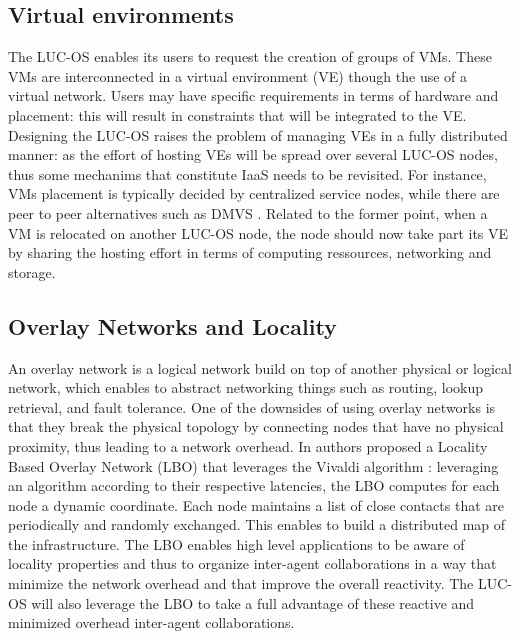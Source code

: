 \subsection{Virtual environments}

The LUC-OS enables its users to request the creation of groups of VMs. These
VMs are interconnected in a virtual environment (VE) though the use of a virtual
network. Users may have specific requirements in terms of hardware and 
placement: this will result in constraints that will be integrated to the VE. 
Designing the LUC-OS raises the problem of managing VEs in a fully distributed 
manner: as the effort of hosting VEs will be spread over several LUC-OS nodes, 
thus some mechanims that constitute IaaS needs to be revisited. For instance, 
VMs placement is typically decided by centralized service nodes, while there are
peer to peer alternatives such as DMVS \cite{quesnel:ispa2013}. Related to the 
former point, when a VM is relocated on another LUC-OS node, the node should now
take part its VE by sharing the hosting effort in terms of computing ressources,
networking and storage.


\subsection{Overlay Networks and Locality}

An overlay network is a logical network build on top of another physical or 
logical network, which enables to abstract networking things such as routing, 
lookup retrieval, and fault tolerance. One of the downsides of using overlay 
networks is that they break the physical topology by connecting nodes that have 
no physical proximity, thus leading to a network overhead. In 
\cite{pastor:hal-00991530} authors proposed a Locality Based Overlay Network 
(LBO) that leverages the Vivaldi algorithm \cite{dabek:2004:vivaldi}: leveraging
an algorithm according to their respective latencies, the LBO computes for each 
node a dynamic coordinate. Each node maintains a list of close contacts that are
periodically and randomly exchanged. This enables to build a distributed map of 
the infrastructure. The LBO enables high level applications to be aware of 
locality properties and thus to organize inter-agent collaborations in a way 
that minimize the network overhead and that improve the overall reactivity. The 
LUC-OS will also leverage the LBO to take a full advantage of these reactive and
minimized overhead inter-agent collaborations.





